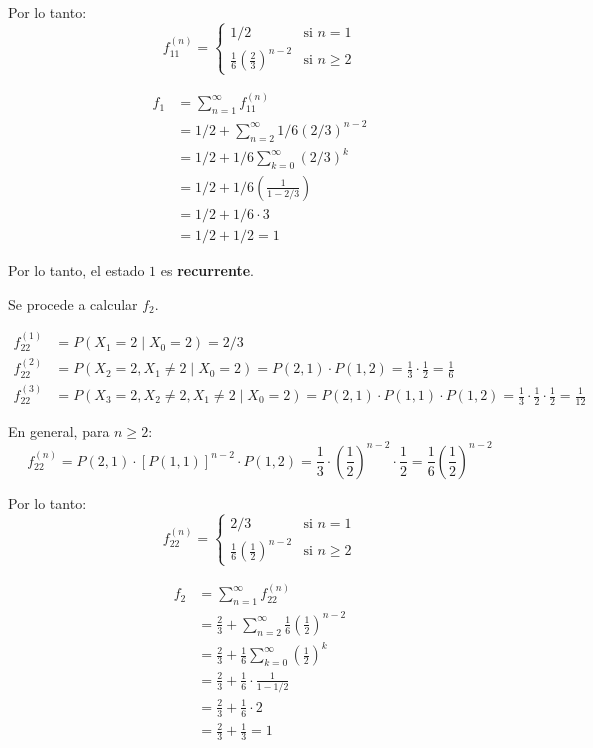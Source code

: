 \documentclass[12pt,a4paper]{article}
\begin{document}
Por lo tanto:
\begin{equation*}
f_{11}^{(n)} = \begin{cases}
1/2 & \text{si } n = 1 \\
\frac{1}{6} \left(\frac{2}{3}\right)^{n-2} & \text{si } n \geq 2
\end{cases}
\end{equation*}

\begin{align*}
f_1 &= \sum_{n=1}^{\infty} f_{11}^{(n)} \\
&= 1/2 + \sum_{n=2}^{\infty} 1/6 (2/3)^{n-2} \\
&= 1/2 + 1/6 \sum_{k=0}^{\infty} (2/3)^k \\
&= 1/2 + 1/6 \left(\frac{1}{1 - 2/3}\right) \\
&= 1/2 + 1/6 \cdot 3 \\
&= 1/2 + 1/2 = 1
\end{align*}

Por lo tanto, el estado $1$ es \textbf{recurrente}.

Se procede a calcular $f_2$.

\begin{align*}
f_{22}^{(1)} &= P(X_1=2 \mid X_0=2) = 2/3 \\
f_{22}^{(2)} &= P(X_2=2, X_1 \neq 2 \mid X_0=2) = P(2,1) \cdot P(1,2) = \frac{1}{3} \cdot \frac{1}{2} = \frac{1}{6} \\
f_{22}^{(3)} &= P(X_3=2, X_2 \neq 2, X_1 \neq 2 \mid X_0=2) = P(2,1) \cdot P(1,1) \cdot P(1,2) = \frac{1}{3} \cdot \frac{1}{2} \cdot \frac{1}{2} = \frac{1}{12}
\end{align*}

En general, para $n \geq 2$:
\begin{equation*}
f_{22}^{(n)} = P(2,1) \cdot [P(1,1)]^{n-2} \cdot P(1,2) = \frac{1}{3} \cdot \left(\frac{1}{2}\right)^{n-2} \cdot \frac{1}{2} = \frac{1}{6} \left(\frac{1}{2}\right)^{n-2}
\end{equation*}

Por lo tanto:
\begin{equation*}
f_{22}^{(n)} = \begin{cases}
2/3 & \text{si } n = 1 \\
\frac{1}{6} \left(\frac{1}{2}\right)^{n-2} & \text{si } n \geq 2
\end{cases}
\end{equation*}

\begin{align*}
f_2 &= \sum_{n=1}^{\infty} f_{22}^{(n)} \\
&= \frac{2}{3} + \sum_{n=2}^{\infty} \frac{1}{6} \left(\frac{1}{2}\right)^{n-2} \\
&= \frac{2}{3} + \frac{1}{6} \sum_{k=0}^{\infty} \left(\frac{1}{2}\right)^k \\
&= \frac{2}{3} + \frac{1}{6} \cdot \frac{1}{1 - 1/2} \\
&= \frac{2}{3} + \frac{1}{6} \cdot 2 \\
&= \frac{2}{3} + \frac{1}{3} = 1
\end{align*}
\end{document}
